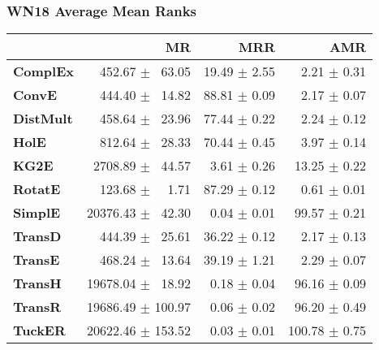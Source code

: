 \documentclass{article}
\begin{document}
\subsubsection{WN18 Average Mean Ranks}
    \begin{center}
    \begin{tabular}{lrrr}
\toprule
{} &                 MR &           MRR &            AMR \\
\midrule
\textbf{ComplEx } &  $\phantom{5}$$\phantom{5}$452.67 $\pm$ $\phantom{5}$63.05 &  19.49 $\pm$ 2.55 &  $\phantom{5}$$\phantom{5}$2.21 $\pm$ 0.31 \\
\textbf{ConvE   } &  $\phantom{5}$$\phantom{5}$444.40 $\pm$ $\phantom{5}$14.82 &  88.81 $\pm$ 0.09 &  $\phantom{5}$$\phantom{5}$2.17 $\pm$ 0.07 \\
\textbf{DistMult} &  $\phantom{5}$$\phantom{5}$458.64 $\pm$ $\phantom{5}$23.96 &  77.44 $\pm$ 0.22 &  $\phantom{5}$$\phantom{5}$2.24 $\pm$ 0.12 \\
\textbf{HolE    } &  $\phantom{5}$$\phantom{5}$812.64 $\pm$ $\phantom{5}$28.33 &  70.44 $\pm$ 0.45 &  $\phantom{5}$$\phantom{5}$3.97 $\pm$ 0.14 \\
\textbf{KG2E    } &  $\phantom{5}$2708.89 $\pm$ $\phantom{5}$44.57 &  $\phantom{5}$3.61 $\pm$ 0.26 &  $\phantom{5}$13.25 $\pm$ 0.22 \\
\textbf{RotatE  } &  $\phantom{5}$$\phantom{5}$123.68 $\pm$ $\phantom{5}$$\phantom{5}$1.71 &  87.29 $\pm$ 0.12 &  $\phantom{5}$$\phantom{5}$0.61 $\pm$ 0.01 \\
\textbf{SimplE  } &  20376.43 $\pm$ $\phantom{5}$42.30 &  $\phantom{5}$0.04 $\pm$ 0.01 &  $\phantom{5}$99.57 $\pm$ 0.21 \\
\textbf{TransD  } &  $\phantom{5}$$\phantom{5}$444.39 $\pm$ $\phantom{5}$25.61 &  36.22 $\pm$ 0.12 &  $\phantom{5}$$\phantom{5}$2.17 $\pm$ 0.13 \\
\textbf{TransE  } &  $\phantom{5}$$\phantom{5}$468.24 $\pm$ $\phantom{5}$13.64 &  39.19 $\pm$ 1.21 &  $\phantom{5}$$\phantom{5}$2.29 $\pm$ 0.07 \\
\textbf{TransH  } &  19678.04 $\pm$ $\phantom{5}$18.92 &  $\phantom{5}$0.18 $\pm$ 0.04 &  $\phantom{5}$96.16 $\pm$ 0.09 \\
\textbf{TransR  } &  19686.49 $\pm$ 100.97 &  $\phantom{5}$0.06 $\pm$ 0.02 &  $\phantom{5}$96.20 $\pm$ 0.49 \\
\textbf{TuckER  } &  20622.46 $\pm$ 153.52 &  $\phantom{5}$0.03 $\pm$ 0.01 &  100.78 $\pm$ 0.75 \\
\bottomrule
\end{tabular}

    \end{center}
\end{document}
